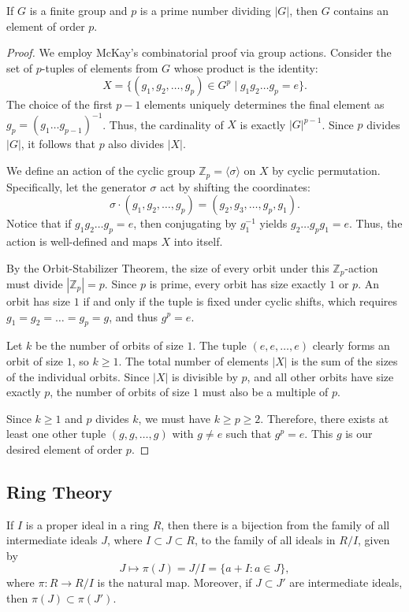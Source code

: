\documentclass[11pt]{scrartcl}
\begin{document}
\begin{theorem}
    If $G$ is a finite group and $p$ is a prime number dividing $|G|$, then $G$ contains an element of order $p$.
\end{theorem}
\begin{proof}
    We employ McKay's combinatorial proof via group actions. Consider the set of $p$-tuples of elements from $G$ whose product is the identity:
    \[ X = \{ (g_1, g_2, \dots, g_p) \in G^p \mid g_1 g_2 \dots g_p = e \}. \]
    The choice of the first $p-1$ elements uniquely determines the final element as $g_p = (g_1 \dots g_{p-1})^{-1}$. Thus, the cardinality of $X$ is exactly $|G|^{p-1}$. Since $p$ divides $|G|$, it follows that $p$ also divides $|X|$.
    
    We define an action of the cyclic group $\mathbb{Z}_p = \langle \sigma \rangle$ on $X$ by cyclic permutation. Specifically, let the generator $\sigma$ act by shifting the coordinates:
    \[ \sigma \cdot (g_1, g_2, \dots, g_p) = (g_2, g_3, \dots, g_p, g_1). \]
    Notice that if $g_1 g_2 \dots g_p = e$, then conjugating by $g_1^{-1}$ yields $g_2 \dots g_p g_1 = e$. Thus, the action is well-defined and maps $X$ into itself.
    
    By the Orbit-Stabilizer Theorem, the size of every orbit under this $\mathbb{Z}_p$-action must divide $|\mathbb{Z}_p| = p$. Since $p$ is prime, every orbit has size exactly $1$ or $p$.
    An orbit has size $1$ if and only if the tuple is fixed under cyclic shifts, which requires $g_1 = g_2 = \dots = g_p = g$, and thus $g^p = e$.
    
    Let $k$ be the number of orbits of size $1$. The tuple $(e, e, \dots, e)$ clearly forms an orbit of size $1$, so $k \ge 1$. The total number of elements $|X|$ is the sum of the sizes of the individual orbits. Since $|X|$ is divisible by $p$, and all other orbits have size exactly $p$, the number of orbits of size $1$ must also be a multiple of $p$. 
    
    Since $k \ge 1$ and $p$ divides $k$, we must have $k \ge p \ge 2$. Therefore, there exists at least one other tuple $(g, g, \dots, g)$ with $g \neq e$ such that $g^p = e$. This $g$ is our desired element of order $p$.
\end{proof}

\subsection{Ring Theory}

\begin{theorem}
   If $I$ is a proper ideal in a ring $R$, then there is a bijection from the family of all intermediate ideals $J$, where $I \subset J \subset R$, to the family of all ideals in $R/I$, given by $$ J \mapsto \pi(J) = J/I = \{a + I: a\in J\},$$ where $\pi: R \to R/I$ is the natural map. Moreover, if $ J \subset J'$ are intermediate ideals, then $\pi(J) \subset \pi(J')$.
\end{theorem}
\end{document}
